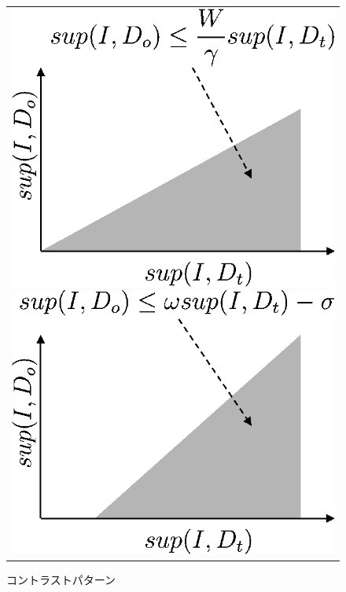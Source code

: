 \begin{figure}[htbp]
\begin{center}
\begin{tabular}{c}

\begin{minipage}{0.3\hsize}
\begin{center}
\includegraphics[scale=0.5]{./ep.eps}
\caption{顕在パターン\label{fig:ep}}
\end{center}
\end{minipage}

\begin{minipage}{0.3\hsize}
\begin{center}
\includegraphics[scale=0.5]{./cp.eps}
\caption{コントラストパターン\label{fig:cp}}
\end{center}
\end{minipage}


\end{tabular}
\end{center}
\end{figure}
